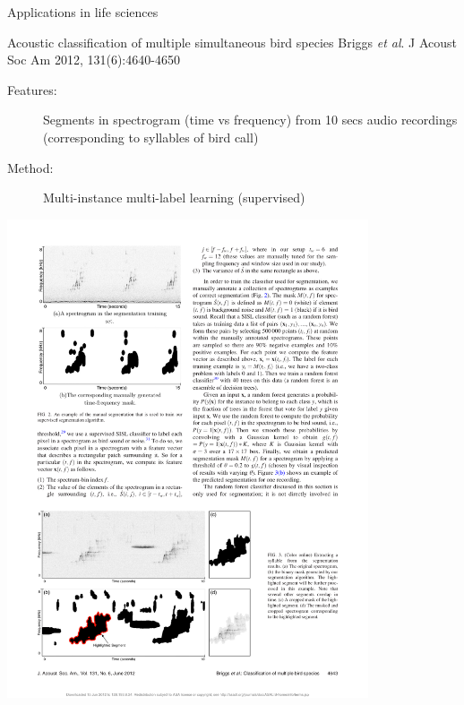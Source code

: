 \documentclass[pdf]{beamer}
\begin{document}
\begin{frame}{Applications in life sciences}
\begin{exampleblock}{Acoustic classification of multiple simultaneous bird species \vskip-1mm{\tiny Briggs \textit{et al}. J Acoust Soc Am 2012, 131(6):4640-4650}}
\begin{description}
	\item[Features:] Segments in spectrogram (time vs frequency) from 10 secs audio recordings (corresponding to syllables of bird call)
	\item[Method:] Multi-instance multi-label learning (supervised)
\end{description}
\begin{center}
	\includegraphics[width=0.8\textwidth]{briggs.pdf}
\end{center}
\end{exampleblock}
\end{frame}
\end{document}
